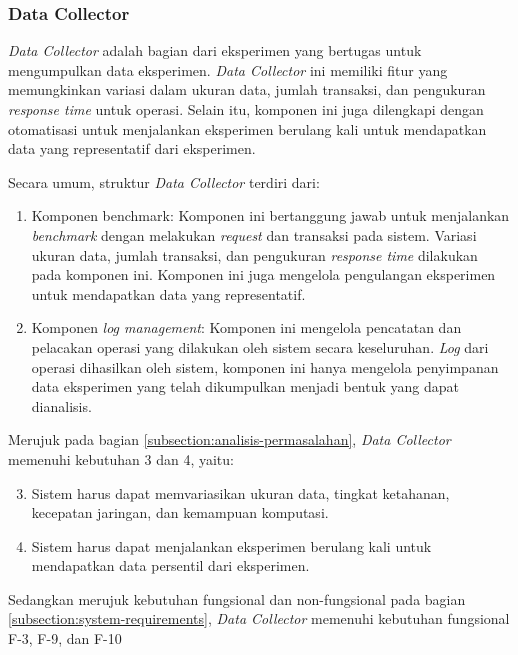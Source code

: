 \subsubsection{Data Collector}
\label{subsubsection:data-collector}

\textit{Data Collector} adalah bagian dari eksperimen yang bertugas untuk mengumpulkan data eksperimen. \textit{Data Collector} ini memiliki fitur yang memungkinkan variasi dalam ukuran data, jumlah transaksi, dan pengukuran \textit{response time} untuk operasi. Selain itu, komponen ini juga dilengkapi dengan otomatisasi untuk menjalankan eksperimen berulang kali untuk mendapatkan data yang representatif dari eksperimen.

Secara umum, struktur \textit{Data Collector} terdiri dari:

\begin{enumerate}
    \item Komponen benchmark: Komponen ini bertanggung jawab untuk menjalankan \textit{benchmark} dengan melakukan \textit{request} dan transaksi pada sistem. Variasi ukuran data, jumlah transaksi, dan pengukuran \textit{response time} dilakukan pada komponen ini. Komponen ini juga mengelola pengulangan eksperimen untuk mendapatkan data yang representatif.
    \item Komponen \textit{log management}: Komponen ini mengelola pencatatan dan pelacakan operasi yang dilakukan oleh sistem secara keseluruhan. \textit{Log} dari operasi dihasilkan oleh sistem, komponen ini hanya mengelola penyimpanan data eksperimen yang telah dikumpulkan menjadi bentuk yang dapat dianalisis.
\end{enumerate}

Merujuk pada bagian \ref{subsection:analisis-permasalahan}, \textit{Data Collector} memenuhi kebutuhan 3 dan 4, yaitu:

\begin{enumerate}
    \setcounter{enumi}{2}
    \item Sistem harus dapat memvariasikan ukuran data, tingkat ketahanan, kecepatan jaringan, dan kemampuan komputasi.
    \item Sistem harus dapat menjalankan eksperimen berulang kali untuk mendapatkan data persentil dari eksperimen.
\end{enumerate}

Sedangkan merujuk kebutuhan fungsional dan non-fungsional pada bagian \ref{subsection:system-requirements}, \textit{Data Collector} memenuhi kebutuhan fungsional F-3, F-9, dan F-10

